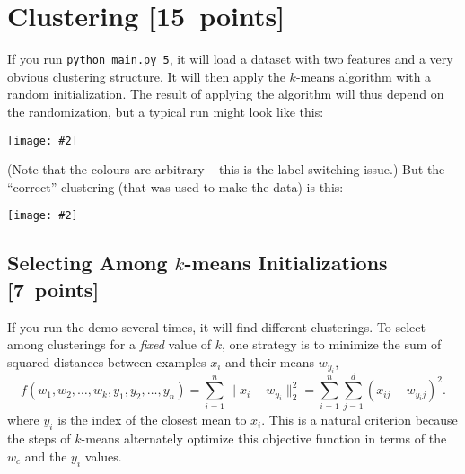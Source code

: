 \documentclass{article}
\newcommand\pts[1]{\textcolor{pointscolour}{[#1~points]}}
\newcommand{\norm}[1]{\lVert #1 \rVert}
\newcommand{\centerfig}[2]{\begin{center}\texttt{[image: \#2]}\end{center}}
\begin{document}
    \clearpage
    \section{Clustering \pts{15}}

    If you run \verb|python main.py 5|, it will load a dataset with two features
    and a very obvious clustering structure. It will then apply the $k$-means algorithm
    with a random initialization. The result of applying the
    algorithm will thus depend on the randomization, but a typical run might look like this:
    \centerfig{.5}{figs/kmeans_basic.png}
    (Note that the colours are arbitrary -- this is the label switching issue.)
    But the ``correct'' clustering (that was used to make the data) is this:
    \centerfig{.5}{figs/kmeans_good.png}


    \clearpage
    \subsection{Selecting Among $k$-means Initializations \pts{7}}

    If you run the demo several times, it will find different clusterings. To select among clusterings for a \emph{fixed} value of $k$, one strategy is to minimize the sum of squared distances between examples $x_i$ and their means $w_{y_i}$,
    \[
    f(w_1,w_2,\dots,w_k,y_1,y_2,\dots,y_n) = \sum_{i=1}^n \norm{x_i - w_{y_i}}_2^2 = \sum_{i=1}^n \sum_{j=1}^d (x_{ij} - w_{y_ij})^2.
    \]
    where $y_i$ is the index of the closest mean to $x_i$. This is a natural criterion because the steps of $k$-means alternately optimize this objective function in terms of the $w_c$ and the $y_i$ values.
\end{document}
